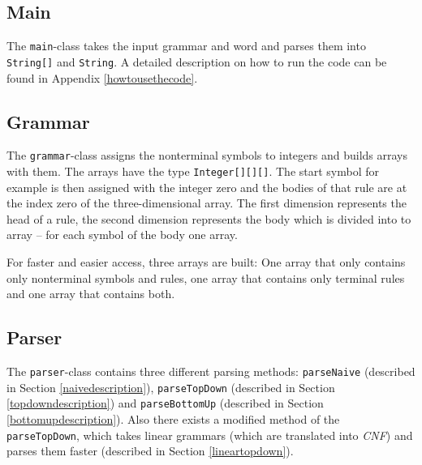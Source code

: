 \documentclass[a4paper, 11pt]{article}
\begin{document}
\subsection{Main}
\label{main}

The \texttt{main}-class takes the input grammar and word and parses them into \texttt{String[]} and \texttt{String}. 
A detailed description on how to run the code can be found in Appendix \ref{howtousethecode}.



\subsection{Grammar}
\label{grammar}


The \texttt{grammar}-class assigns the nonterminal symbols to integers and builds arrays with them. The arrays have the type \texttt{Integer[][][]}. The start symbol for example is then assigned with the integer zero and the bodies of that rule are at the index zero of the three-dimensional array. The first dimension represents the head of a rule, the second dimension represents the body which is divided into to array -- for each symbol of the body one array.


For faster and easier access, three arrays are built: One array that only contains only nonterminal symbols and rules, one array that contains only terminal rules and one array that contains both.









\subsection{Parser}
\label{parser}

The \texttt{parser}-class contains three different parsing methods: \texttt{parseNaive} (described in Section \ref{naivedescription}), \texttt{parseTopDown} (described in Section \ref{topdowndescription}) and \texttt{parseBottomUp} (described in Section \ref{bottomupdescription}). Also there exists a modified method of the \texttt{parseTopDown}, which takes linear grammars (which are translated into \textit{CNF}) and parses them faster (described in Section \ref{lineartopdown}).
\end{document}
